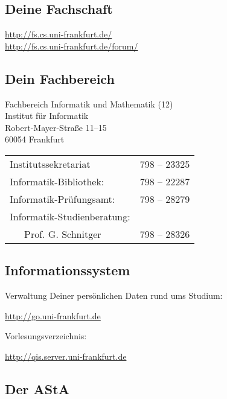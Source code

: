 \subsection*{Deine Fachschaft}

\url{http://fs.cs.uni-frankfurt.de/}\\
\url{http://fs.cs.uni-frankfurt.de/forum/}\\
\emailfachschaft

\subsection*{Dein Fachbereich}

Fachbereich Informatik und Mathematik (12)\\
Institut für Informatik\\
Robert-Mayer-Straße 11–15\\
60054 Frankfurt\\

\begin{tabular}{ll}
Institutssekretariat & 798 – 23325 \\
Informatik-Bibliothek: & 798 – 22287\\
Informatik-Prüfungsamt: & 798 – 28279\\
Informatik-Studienberatung: & \\
~~~Prof. G. Schnitger & 798 – 28326\\
\end{tabular}

\subsection*{Informationssystem}

Verwaltung Deiner persönlichen Daten rund ums Studium:

\begin{center}\url{http://go.uni-frankfurt.de}\end{center}

Vorlesungsverzeichnis:

\begin{center}\url{http://qis.server.uni-frankfurt.de}\end{center}


\subsection*{Der AStA}

